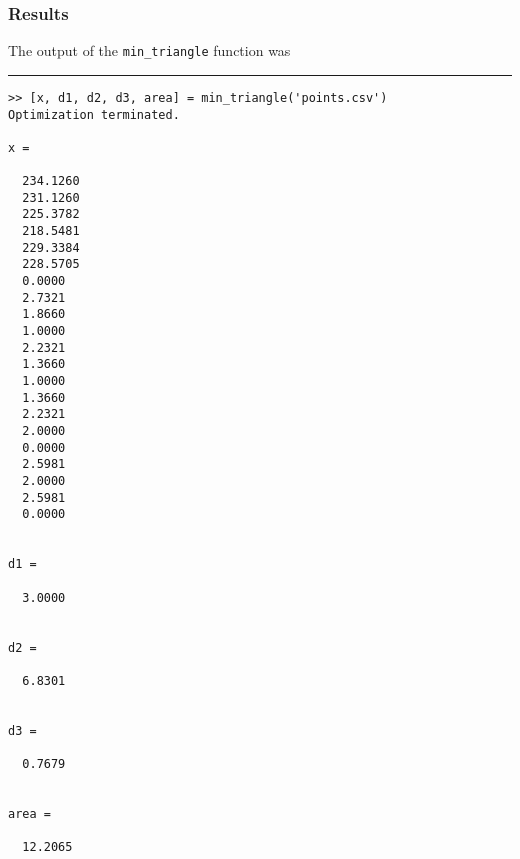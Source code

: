 \documentclass{article}
\begin{document}
\subsubsection{Results}

The output of the \texttt{min\_triangle} function was

\vspace{0.25in}
\hrule

\begin{verbatim}
>> [x, d1, d2, d3, area] = min_triangle('points.csv')
Optimization terminated.

x =

  234.1260
  231.1260
  225.3782
  218.5481
  229.3384
  228.5705
  0.0000
  2.7321
  1.8660
  1.0000
  2.2321
  1.3660
  1.0000
  1.3660
  2.2321
  2.0000
  0.0000
  2.5981
  2.0000
  2.5981
  0.0000


d1 =

  3.0000


d2 =

  6.8301


d3 =

  0.7679


area =

  12.2065
\end{verbatim}
\end{document}
